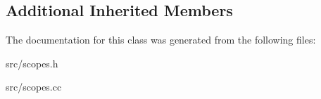 \subsection*{Additional Inherited Members}


The documentation for this class was generated from the following files\+:\begin{DoxyCompactItemize}
\item 
src/scopes.\+h\item 
src/scopes.\+cc\end{DoxyCompactItemize}
